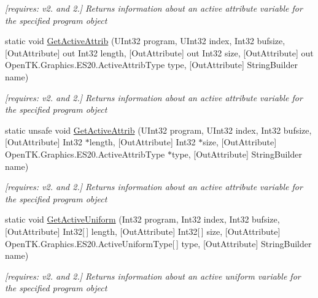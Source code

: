 \begin{DoxyCompactItemize}
\begin{DoxyCompactList}\small\item\em \mbox{[}requires\-: v2. and 2.\mbox{]} Returns information about an active attribute variable for the specified program object \end{DoxyCompactList}\item 
static void \hyperlink{class_open_t_k_1_1_graphics_1_1_e_s20_1_1_g_l_a89ede6b14fd62aa2d360bb7175a6decb}{Get\-Active\-Attrib} (U\-Int32 program, U\-Int32 index, Int32 bufsize, \mbox{[}Out\-Attribute\mbox{]} out Int32 length, \mbox{[}Out\-Attribute\mbox{]} out Int32 size, \mbox{[}Out\-Attribute\mbox{]} out Open\-T\-K.\-Graphics.\-E\-S20.\-Active\-Attrib\-Type type, \mbox{[}Out\-Attribute\mbox{]} String\-Builder name)
\begin{DoxyCompactList}\small\item\em \mbox{[}requires\-: v2. and 2.\mbox{]} Returns information about an active attribute variable for the specified program object \end{DoxyCompactList}\item 
static unsafe void \hyperlink{class_open_t_k_1_1_graphics_1_1_e_s20_1_1_g_l_a5e3dacd5eb749a566f29c1f4acf9bd08}{Get\-Active\-Attrib} (U\-Int32 program, U\-Int32 index, Int32 bufsize, \mbox{[}Out\-Attribute\mbox{]} Int32 $\ast$length, \mbox{[}Out\-Attribute\mbox{]} Int32 $\ast$size, \mbox{[}Out\-Attribute\mbox{]} Open\-T\-K.\-Graphics.\-E\-S20.\-Active\-Attrib\-Type $\ast$type, \mbox{[}Out\-Attribute\mbox{]} String\-Builder name)
\begin{DoxyCompactList}\small\item\em \mbox{[}requires\-: v2. and 2.\mbox{]} Returns information about an active attribute variable for the specified program object \end{DoxyCompactList}\item 
static void \hyperlink{class_open_t_k_1_1_graphics_1_1_e_s20_1_1_g_l_ae906dc907dc97097667c17c6450f0165}{Get\-Active\-Uniform} (Int32 program, Int32 index, Int32 bufsize, \mbox{[}Out\-Attribute\mbox{]} Int32\mbox{[}$\,$\mbox{]} length, \mbox{[}Out\-Attribute\mbox{]} Int32\mbox{[}$\,$\mbox{]} size, \mbox{[}Out\-Attribute\mbox{]} Open\-T\-K.\-Graphics.\-E\-S20.\-Active\-Uniform\-Type\mbox{[}$\,$\mbox{]} type, \mbox{[}Out\-Attribute\mbox{]} String\-Builder name)
\begin{DoxyCompactList}\small\item\em \mbox{[}requires\-: v2. and 2.\mbox{]} Returns information about an active uniform variable for the specified program object \end{DoxyCompactList}\item 

\end{DoxyCompactItemize}
